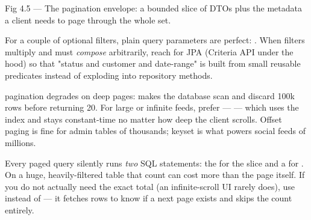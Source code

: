 \begin{wbfigure}{Fig 4.5 --- The pagination envelope: a bounded slice of DTOs plus the metadata a client needs to page through the whole set.}
\end{wbfigure}

 For a couple of optional filters, plain  query parameters are perfect: . When filters multiply and must \emph{compose} arbitrarily, reach for JPA  (Criteria API under the hood) so that "status and customer and date-range" is built from small reusable predicates instead of exploding into  repository methods.

\begin{perfnote}
 pagination degrades on deep pages:  makes the database scan and discard 100k rows before returning 20. For large or infinite feeds, prefer  ---  --- which uses the index and stays constant-time no matter how deep the client scrolls. Offset paging is fine for admin tables of thousands; keyset is what powers social feeds of millions.
\end{perfnote}

\begin{dbinsight}
Every paged query silently runs \emph{two} SQL statements: the  for the slice and a  for . On a huge, heavily-filtered table that count can cost more than the page itself. If you do not actually need the exact total (an infinite-scroll UI rarely does), use  instead of  --- it fetches  rows to know if a next page exists and skips the count entirely.
\end{dbinsight}

